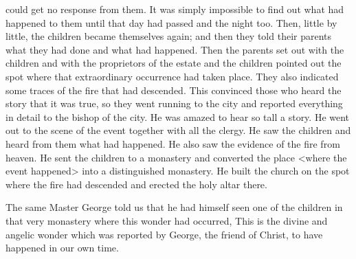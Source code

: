 could get no response from them. It was simply impossible to find
out what had happened to them until that day had passed and the
night too. Then, little by little, the children became themselves
again; and then they told their parents what they had done and
what had happened. Then the parents set out with the children and
with the proprietors of the estate and the children pointed out the
spot where that extraordinary occurrence had taken place. They also
indicated some traces of the fire that had descended. This convinced
those who heard the story that it was true, so they went running to
the city and reported everything in detail to the bishop of the city.
He was amazed to hear so tall a story. He went out to the scene of
the event together with all the clergy. He saw the children and heard
from them what had happened. He also saw the evidence of the fire
from heaven. He sent the children to a monastery and converted the
place <where the event happened> into a distinguished monastery.
He built the church on the spot where the fire had descended and
erected the holy altar there.

The same Master George told us that he had himself seen one
of the children in that very monastery where this wonder had
occurred, This is the divine and angelic wonder which was reported
by George, the friend of Christ, to have happened in our own time.


